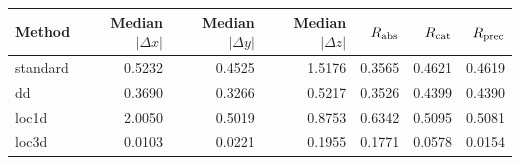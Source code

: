 \begin{tabular}{lrrrrrr}\toprule Method & Median $|\Delta x|$ & Median $|\Delta y|$ & Median $|\Delta z|$ & $R_{\rm abs}$ & $R_{\rm cat}$ & $R_{\rm prec}$\\\midrule
standard & 0.5232 & 0.4525 & 1.5176 & 0.3565 & 0.4621 & 0.4619\\
dd & 0.3690 & 0.3266 & 0.5217 & 0.3526 & 0.4399 & 0.4390\\
loc1d & 2.0050 & 0.5019 & 0.8753 & 0.6342 & 0.5095 & 0.5081\\
loc3d & 0.0103 & 0.0221 & 0.1955 & 0.1771 & 0.0578 & 0.0154\\
\bottomrule\end{tabular}
